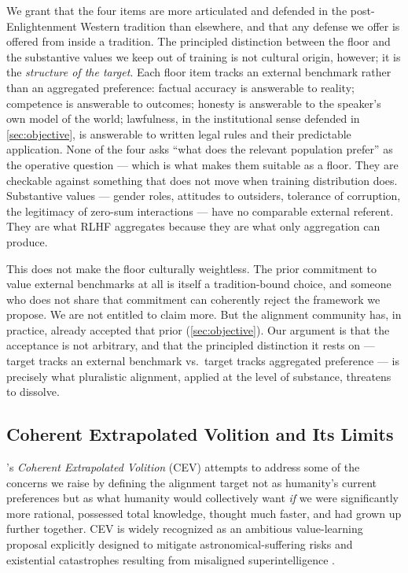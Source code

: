 \documentclass{article}
\theoremstyle{plain}
\theoremstyle{definition}
\theoremstyle{remark}
\begin{document}
We grant that the four items are more articulated and defended in the post-Enlightenment Western tradition than elsewhere, and that any defense we offer is offered from inside a tradition. The principled distinction between the floor and the substantive values we keep out of training is not cultural origin, however; it is the \emph{structure of the target}. Each floor item tracks an external benchmark rather than an aggregated preference: factual accuracy is answerable to reality; competence is answerable to outcomes; honesty is answerable to the speaker's own model of the world; lawfulness, in the institutional sense defended in \cref{sec:objective}, is answerable to written legal rules and their predictable application. None of the four asks ``what does the relevant population prefer'' as the operative question --- which is what makes them suitable as a floor. They are checkable against something that does not move when training distribution does. Substantive values --- gender roles, attitudes to outsiders, tolerance of corruption, the legitimacy of zero-sum interactions --- have no comparable external referent. They are what RLHF aggregates because they are what only aggregation can produce.

This does not make the floor culturally weightless. The prior commitment to value external benchmarks at all is itself a tradition-bound choice, and someone who does not share that commitment can coherently reject the framework we propose. We are not entitled to claim more. But the alignment community has, in practice, already accepted that prior (\cref{sec:objective}). Our argument is that the acceptance is not arbitrary, and that the principled distinction it rests on --- target tracks an external benchmark vs.\ target tracks aggregated preference --- is precisely what pluralistic alignment, applied at the level of substance, threatens to dissolve.

\subsection{Coherent Extrapolated Volition and Its Limits}
\label{sec:alt-cev}

\citet{yudkowsky2004cev}'s \emph{Coherent Extrapolated Volition} (CEV) attempts to address some of the concerns we raise by defining the alignment target not as humanity's current preferences but as what humanity would collectively want \emph{if} we were significantly more rational, possessed total knowledge, thought much faster, and had grown up further together. CEV is widely recognized as an ambitious value-learning proposal explicitly designed to mitigate astronomical-suffering risks and existential catastrophes resulting from misaligned superintelligence \citep{bostrom2014superintelligence}.
\end{document}
